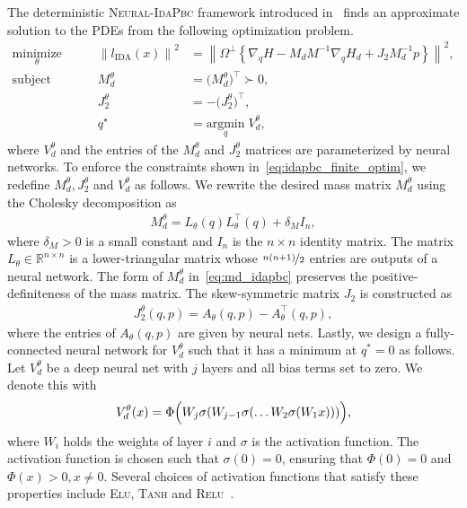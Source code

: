 The deterministic \textsc{Neural-IdaPbc} framework introduced
in~\cite{sirichotiyakul2022data} finds an approximate solution to the PDEs from the
following optimization problem.
\begin{equation}
  \begin{aligned}
      \underset{\theta }{\textrm{minimize}} 
      &&\quad \left\| l_{\textrm{IDA}} (x) \right\|^2 &= \left\| \Omega^\perp \left\{ \nabla_qH - M_dM^{-1} \nabla_qH_d + J_2M_d^{-1}p \right\} \right\|^2, \\
      \textrm{subject to}
      &&\quad M_d^\theta &= \big( M_d^\theta \big)^\top \succ 0, \\
      &&\quad J_2^\theta &= -\big( J_2^\theta \big)^\top, \\
      &&\quad q^\star &= \underset{q}{\textrm{argmin}}\; V_d^\theta,
  \end{aligned}    
  \label{eq:idapbc_finite_optim}%
\end{equation}
\noindent where $V^\theta_d$ and the entries of the $M^\theta_d$ and $J^\theta_2$ matrices
are parameterized by neural networks. 
%
To enforce the constraints shown in~\eqref{eq:idapbc_finite_optim}, we redefine
$M^\theta_d, J^\theta_2$ and $V^\theta_d$ as follows.
%
We rewrite the desired mass matrix $M^\theta_d$ using the Cholesky decomposition as
\begin{align}
  M^\theta_d = L_{\theta}(q)L_{\theta}^\top(q) + \delta_M I_n,
  \label{eq:md_idapbc}
\end{align}
\noindent where $\delta_M > 0$ is a small constant and $I_n$ is the $n \times n$
identity matrix.
%
The matrix $L_{\theta} \in \mathbb{R}^{n \times n}$ is a lower-triangular matrix
whose $\nicefrac{n(n+1)}{2}$ entries are outputs of a neural network. 
%
The form of $M_d^\theta$ in~\eqref{eq:md_idapbc} preserves the
positive-definiteness of the mass matrix.
%
The skew-symmetric matrix $J_2$ is constructed as 
\begin{align*}
  J_2^\theta(q, p) = A_\theta(q, p) - A^\top_\theta(q, p),
\end{align*}
\noindent where the entries of $A_{\theta}(q, p)$ are given by neural nets.
%
Lastly, we design a fully-connected neural network for $V^\theta_d$ such that it
has a minimum at $q^*=0$ as follows.
%
Let $V^\theta_d$ be a deep neural net with $j$ layers and all bias terms set to
zero. We denote this with
\begin{equation}
  V_d^\theta(x) = \Phi \Bigl( W_j\sigma(W_{j-1}\sigma(\ldots W_2\sigma(W_1x))) \Bigr),
  \label{eq:Vdnet_constraint}
\end{equation}
\noindent where $W_i$ holds the weights of layer $i$ and $\sigma$ is the activation function.
%
The activation function is chosen such that $\sigma(0) = 0$, ensuring that
$\Phi(0) = 0$ and $\Phi(x) > 0, x \ne 0$.
%
Several choices of activation functions that satisfy these properties include
\textsc{Elu}, \textsc{Tanh} and \textsc{Relu}~\cite{sharma2017activation}.
%


